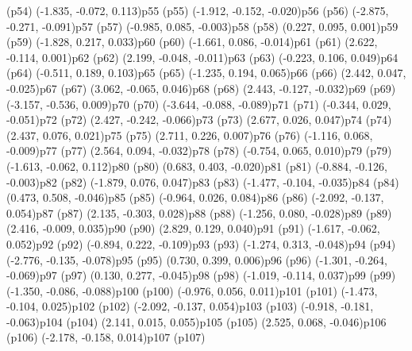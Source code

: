 \psdot(p54)
\psPoint(-1.835, -0.072, 0.113){p55}
\psdot(p55)
\psPoint(-1.912, -0.152, -0.020){p56}
\psdot(p56)
\psPoint(-2.875, -0.271, -0.091){p57}
\psdot(p57)
\psPoint(-0.985, 0.085, -0.003){p58}
\psdot(p58)
\psPoint(0.227, 0.095, 0.001){p59}
\psdot(p59)
\psPoint(-1.828, 0.217, 0.033){p60}
\psdot(p60)
\psPoint(-1.661, 0.086, -0.014){p61}
\psdot(p61)
\psPoint(2.622, -0.114, 0.001){p62}
\psdot(p62)
\psPoint(2.199, -0.048, -0.011){p63}
\psdot(p63)
\psPoint(-0.223, 0.106, 0.049){p64}
\psdot(p64)
\psPoint(-0.511, 0.189, 0.103){p65}
\psdot(p65)
\psPoint(-1.235, 0.194, 0.065){p66}
\psdot(p66)
\psPoint(2.442, 0.047, -0.025){p67}
\psdot(p67)
\psPoint(3.062, -0.065, 0.046){p68}
\psdot(p68)
\psPoint(2.443, -0.127, -0.032){p69}
\psdot(p69)
\psPoint(-3.157, -0.536, 0.009){p70}
\psdot(p70)
\psPoint(-3.644, -0.088, -0.089){p71}
\psdot(p71)
\psPoint(-0.344, 0.029, -0.051){p72}
\psdot(p72)
\psPoint(2.427, -0.242, -0.066){p73}
\psdot(p73)
\psPoint(2.677, 0.026, 0.047){p74}
\psdot(p74)
\psPoint(2.437, 0.076, 0.021){p75}
\psdot(p75)
\psPoint(2.711, 0.226, 0.007){p76}
\psdot(p76)
\psPoint(-1.116, 0.068, -0.009){p77}
\psdot(p77)
\psPoint(2.564, 0.094, -0.032){p78}
\psdot(p78)
\psPoint(-0.754, 0.065, 0.010){p79}
\psdot(p79)
\psPoint(-1.613, -0.062, 0.112){p80}
\psdot(p80)
\psPoint(0.683, 0.403, -0.020){p81}
\psdot(p81)
\psPoint(-0.884, -0.126, -0.003){p82}
\psdot(p82)
\psPoint(-1.879, 0.076, 0.047){p83}
\psdot(p83)
\psPoint(-1.477, -0.104, -0.035){p84}
\psdot(p84)
\psPoint(0.473, 0.508, -0.046){p85}
\psdot(p85)
\psPoint(-0.964, 0.026, 0.084){p86}
\psdot(p86)
\psPoint(-2.092, -0.137, 0.054){p87}
\psdot(p87)
\psPoint(2.135, -0.303, 0.028){p88}
\psdot(p88)
\psPoint(-1.256, 0.080, -0.028){p89}
\psdot(p89)
\psPoint(2.416, -0.009, 0.035){p90}
\psdot(p90)
\psPoint(2.829, 0.129, 0.040){p91}
\psdot(p91)
\psPoint(-1.617, -0.062, 0.052){p92}
\psdot(p92)
\psPoint(-0.894, 0.222, -0.109){p93}
\psdot(p93)
\psPoint(-1.274, 0.313, -0.048){p94}
\psdot(p94)
\psPoint(-2.776, -0.135, -0.078){p95}
\psdot(p95)
\psPoint(0.730, 0.399, 0.006){p96}
\psdot(p96)
\psPoint(-1.301, -0.264, -0.069){p97}
\psdot(p97)
\psPoint(0.130, 0.277, -0.045){p98}
\psdot(p98)
\psPoint(-1.019, -0.114, 0.037){p99}
\psdot(p99)
\psPoint(-1.350, -0.086, -0.088){p100}
\psdot(p100)
\psPoint(-0.976, 0.056, 0.011){p101}
\psdot(p101)
\psPoint(-1.473, -0.104, 0.025){p102}
\psdot(p102)
\psPoint(-2.092, -0.137, 0.054){p103}
\psdot(p103)
\psPoint(-0.918, -0.181, -0.063){p104}
\psdot(p104)
\psPoint(2.141, 0.015, 0.055){p105}
\psdot(p105)
\psPoint(2.525, 0.068, -0.046){p106}
\psdot(p106)
\psPoint(-2.178, -0.158, 0.014){p107}
\psdot(p107)
